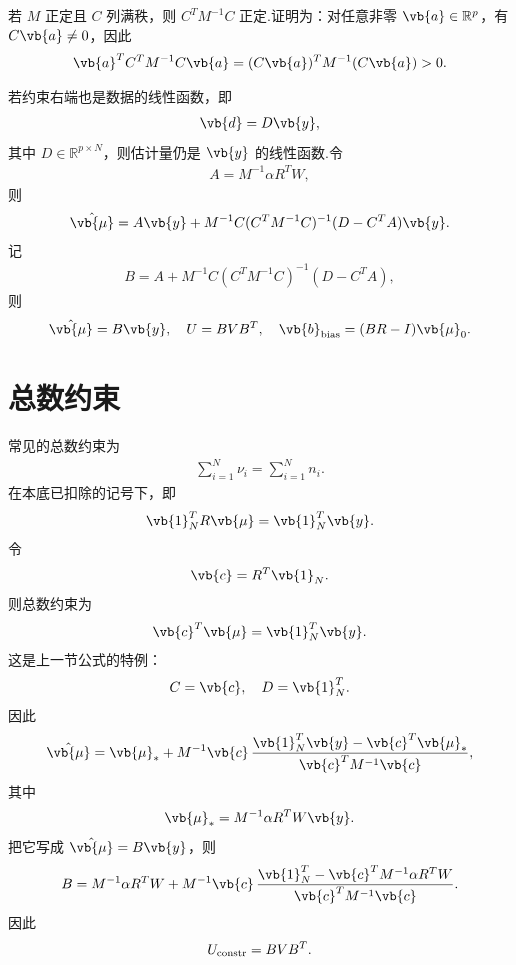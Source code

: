 \begin{note}
	若 \(M\) 正定且 \(C\) 列满秩，则 \(C^TM^{-1}C\) 正定.证明为：对任意非零 \(\vb{a}\in\mathbb{R}^p\)，有 \(C\vb{a}\neq0\)，因此
	\begin{align*}
		\vb{a}^TC^TM^{-1}C\vb{a}
		=(C\vb{a})^TM^{-1}(C\vb{a})>0.
	\end{align*}
\end{note}

若约束右端也是数据的线性函数，即
\begin{align*}
	\vb{d}=D\vb{y},
\end{align*}
其中 \(D\in\mathbb{R}^{p\times N}\)，则估计量仍是 \(\vb{y}\) 的线性函数.令
\begin{align*}
	A=M^{-1}\alpha R^TW,
\end{align*}
则
\begin{align*}
	\hat{\vb{\mu}}
	=
	A\vb{y}
	+M^{-1}C(C^TM^{-1}C)^{-1}(D-C^TA)\vb{y}.
\end{align*}
记
\begin{align*}
	B
	=A
	+M^{-1}C(C^TM^{-1}C)^{-1}(D-C^TA),
\end{align*}
则
\begin{align*}
	\hat{\vb{\mu}}=B\vb{y},\quad
	U=BVB^T,\quad
	\vb{b}_{\rm bias}=(BR-I)\vb{\mu}_0.
\end{align*}

\section{总数约束}

常见的总数约束为
\begin{align*}
	\sum_{i=1}^{N}\nu_i=\sum_{i=1}^{N}n_i.
\end{align*}
在本底已扣除的记号下，即
\begin{align*}
	\vb{1}_N^TR\vb{\mu}=\vb{1}_N^T\vb{y}.
\end{align*}
令
\begin{align*}
	\vb{c}=R^T\vb{1}_N.
\end{align*}
则总数约束为
\begin{align*}
	\vb{c}^T\vb{\mu}=\vb{1}_N^T\vb{y}.
\end{align*}
这是上一节公式的特例：
\begin{align*}
	C=\vb{c},\quad D=\vb{1}_N^T.
\end{align*}
因此
\begin{align*}
	\hat{\vb{\mu}}
	=
	\vb{\mu}_*
	+M^{-1}\vb{c}\,
	\frac{\vb{1}_N^T\vb{y}-\vb{c}^T\vb{\mu}_*}
	{\vb{c}^TM^{-1}\vb{c}},
\end{align*}
其中
\begin{align*}
	\vb{\mu}_*=M^{-1}\alpha R^TW\vb{y}.
\end{align*}
把它写成 \(\hat{\vb{\mu}}=B\vb{y}\)，则
\begin{align*}
	B
	=M^{-1}\alpha R^TW
	+M^{-1}\vb{c}\,
	\frac{\vb{1}_N^T-\vb{c}^TM^{-1}\alpha R^TW}
	{\vb{c}^TM^{-1}\vb{c}}.
\end{align*}
因此
\begin{align*}
	U_{\rm constr}=BVB^T.
\end{align*}

